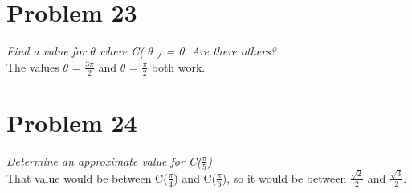 \documentclass[11pt]{article} %
\newcommand\tab[1][1cm]{\hspace*{#1}}
\begin{document}
\section{Problem 23}
\textit{ Find a value for $\theta$ where C( $\theta$ ) = 0. Are there others?}
\\ \tab The values $\theta$ = $\frac{3\pi}{2}$  and $\theta$ = $\frac{\pi}{2}$ both work.

\section{Problem 24}
\textit{Determine an approximate value for C($\frac{\pi}{5}$)}
\\ \tab That value would be between C($\frac{\pi}{4}$) and C($\frac{\pi}{6}$), 
so it would be between $\frac{\sqrt{2}}{2}$ and $\frac{\sqrt{3}}{2}$. 
\end{document}
